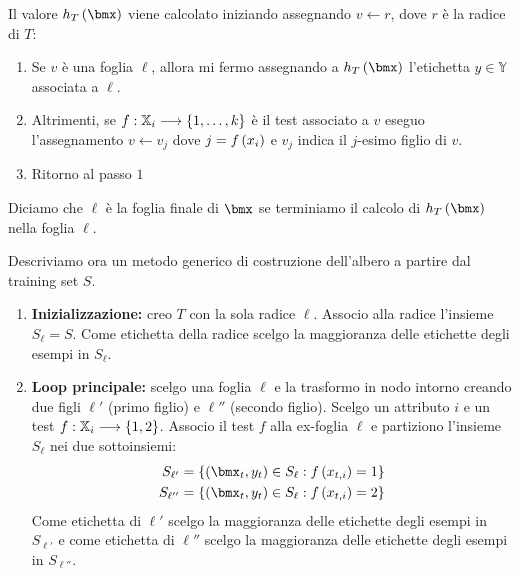 \documentclass[\main/main.tex]{subfiles}
\begin{document}
\begin{multicols}{2}
\begin{definition}
    Il valore \(h_T\rnd{\bmx}\) viene calcolato iniziando assegnando \(v \leftarrow r\), dove \(r\) è la radice di \(T\):
    \begin{enumerate}
        \item Se \(v\) è una foglia \(\ell\), allora mi fermo assegnando a \(h_T\rnd{\bmx}\) l'etichetta \(y \in \mathbb{Y}\) associata a \(\ell\).
        \item Altrimenti, se \(f:\mathbb{X}_i\longrightarrow \left\{1, \ldots, k\right\}\) è il test associato a \(v\) eseguo l'assegnamento \(v \leftarrow v_j\) dove \(j = f\left(x_i\right)\) e \(v_j\) indica il \(j\)-esimo figlio di \(v\).
        \item Ritorno al passo \(1\)
    \end{enumerate}
\end{definition}
\begin{definition}
    Diciamo che \(\ell\) è la foglia finale di \(\bmx\) se terminiamo il calcolo di \(h_T\rnd{\bmx}\) nella foglia \(\ell\).
\end{definition}
\begin{definition}
    Descriviamo ora un metodo generico di costruzione dell'albero a partire dal training set \(S\).
    \begin{enumerate}
        \item \textbf{Inizializzazione:} creo \(T\) con la sola radice \(\ell\). Associo alla radice l'insieme \(S_{\ell} = S\). Come etichetta della radice scelgo la maggioranza delle etichette degli esempi in \(S_{\ell}\).
        \item \textbf{Loop principale:} scelgo una foglia \(\ell\) e la trasformo in nodo intorno creando due figli \(\ell'\) (primo figlio) e \(\ell''\) (secondo figlio). Scelgo un attributo \(i\) e un test \(f:\mathbb{X}_i\longrightarrow \left\{1,2\right\}\). Associo il test \(f\) alla ex-foglia \(\ell\) e partiziono l'insieme \(S_{\ell}\) nei due sottoinsiemi:
        \begin{align*}
            S_{\ell'} &= \crl{\rnd{\bmx_t, y_t} \in S_{\ell}: f\rnd{x_{t,i}}=1}\\
            S_{\ell''}&=\crl{\rnd{\bmx_t, y_t} \in S_{\ell}: f\rnd{x_{t,i}}=2}
        \end{align*}
        Come etichetta di \(\ell'\) scelgo la maggioranza delle etichette degli esempi in \(S_{\ell'}\) e come etichetta di \(\ell''\) scelgo la maggioranza delle etichette degli esempi in \(S_{\ell''}\).
    \end{enumerate}
\end{definition}

\end{multicols}
\end{document}
